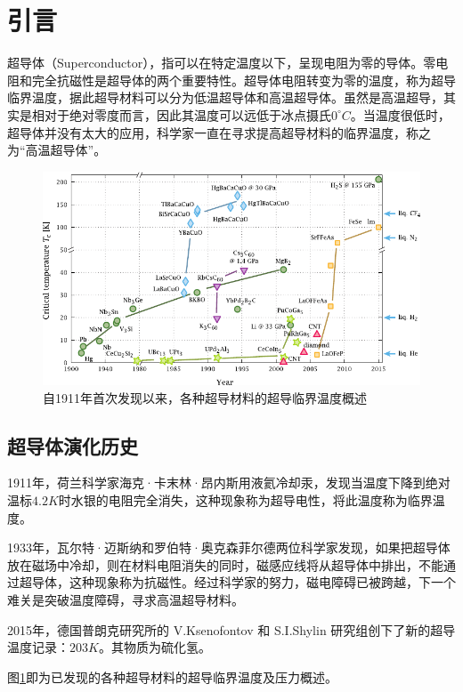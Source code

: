 \documentclass[UTF8, twocolumn]{ctexart}
\begin{document}
\section{引言}

    超导体（Superconductor），指可以在特定温度以下，呈现电阻为零的导体。零电阻和完全抗磁性是超导体的两个重要特性。超导体电阻转变为零的温度，称为超导临界温度，据此超导材料可以分为低温超导体和高温超导体。虽然是高温超导，其实是相对于绝对零度而言，因此其温度可以远低于冰点摄氏$ 0 ^\circ C$。当温度很低时，超导体并没有太大的应用，科学家一直在寻求提高超导材料的临界温度，称之为“高温超导体”。

    \begin{figure}[hb]
        \centering
        \includegraphics[scale=1.2]{image/Timeline_of_Superconductivity_from_1900_to_2015.pdf}
        \caption{自1911年首次发现以来，各种超导材料的超导临界温度概述}
        \label{fig:image1}
    \end{figure}

    \subsection{超导体演化历史}
    1911年，荷兰科学家海克·卡末林·昂内斯用液氦冷却汞，发现当温度下降到绝对温标$4.2K$时水银的电阻完全消失，这种现象称为超导电性，将此温度称为临界温度。

    1933年，瓦尔特·迈斯纳和罗伯特·奥克森菲尔德两位科学家发现，如果把超导体放在磁场中冷却，则在材料电阻消失的同时，磁感应线将从超导体中排出，不能通过超导体，这种现象称为抗磁性。经过科学家的努力，磁电障碍已被跨越，下一个难关是突破温度障碍，寻求高温超导材料。

    2015年，德国普朗克研究所的 V.Ksenofontov 和 S.I.Shylin 研究组创下了新的超导温度记录：$203K$。其物质为硫化氢。

    图\ref{fig:image1}即为已发现的各种超导材料的超导临界温度及压力概述\cite{Ray2016}。
\end{document}
